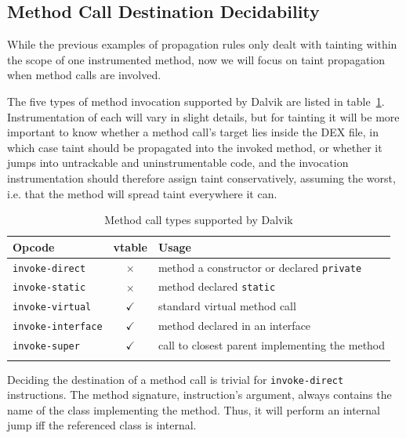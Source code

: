 \documentclass[12pt,twoside,notitlepage]{report}
\newcommand{\tick}{$\checkmark$}
\newcommand{\cross}{$\times$}
\begin{document}
\subsection{Method Call Destination Decidability}

While the previous examples of propagation rules only dealt with tainting within the scope of one instrumented method, now we will focus on taint propagation when method calls are involved. 

The five types of method invocation supported by Dalvik are listed in table~\ref{table:TaintPropagation_MethodCallTypes}. Instrumentation of each will vary in slight details, but for tainting it will be more important to know whether a method call's target lies inside the DEX file, in which case taint should be propagated into the invoked method, or whether it jumps into untrackable and uninstrumentable code, and the invocation instrumentation should therefore assign taint conservatively, assuming the worst, i.e. that the method will spread taint everywhere it can.

\begin{table}[h]
	\begin{center}
	\begin{tabular}{|l|c|l|}
		\firsthline
		\textbf{Opcode}         & \footnotesize{\textbf{vtable}} & \textbf{Usage} \\
		\hline
		\verb$invoke-direct$    & \cross          & method a constructor or declared \verb$private$ \\
		\verb$invoke-static$    & \cross          & method declared \verb$static$ \\
		\hline
		\verb$invoke-virtual$   & \tick           & standard virtual method call \\
		\verb$invoke-interface$ & \tick           & method declared in an interface \\
		\verb$invoke-super$     & \tick           & call to closest parent implementing the method \\
		\lasthline
	\end{tabular}
	\end{center}
	\caption{Method call types supported by Dalvik}
	\label{table:TaintPropagation_MethodCallTypes}
\end{table}

Deciding the destination of a method call is trivial for \verb$invoke-direct$ instructions. The method signature, instruction's argument, always contains the name of the class implementing the method. Thus, it will perform an internal jump iff the referenced class is internal.
\end{document}
